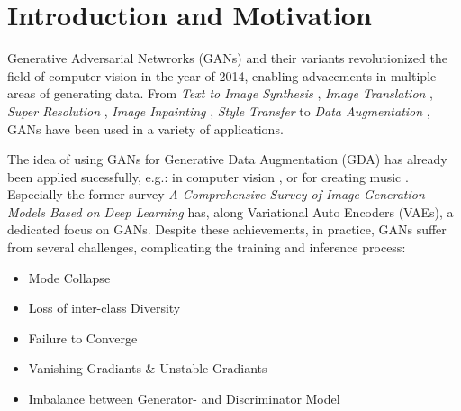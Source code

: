 \section{Introduction and Motivation}\label{introduction_and_motivation}
\pagestyle{fancy}
Generative Adversarial Netwrorks (GANs) \cite{goodfellow2014generativeadversarialnetworks} and their variants revolutionized the field of computer vision in the year of 2014, enabling advacements in multiple areas of generating data. From \textit{Text to Image Synthesis} \cite{reed2016generativeadversarialtextimage}, \textit{Image Translation} \cite{isola2018imagetoimagetranslationconditionaladversarial}, \textit{Super Resolution} \cite{ledig2017photorealisticsingleimagesuperresolution}, \textit{Image Inpainting} \cite{pathak2016contextencodersfeaturelearning}, \textit{Style Transfer} \cite{wang2023multimodalityguidedimagestyletransfer} to \textit{Data Augmentation} \cite{shorten2019survey}, GANs have been used in a variety of applications.

The idea of using GANs for Generative Data Augmentation (GDA) has already been applied sucessfully, e.g.: in computer vision \cite{Li2025comprehensivesurvedeepimages}, \cite{biswas2023generativeadversarialnetworksdata} or for creating music \cite{ji2020comprehensivesurveydeepmusic}. Especially the former survey \textit{A Comprehensive Survey of Image Generation Models Based on Deep Learning} has, along Variational Auto Encoders (VAEs), a dedicated focus on GANs. Despite these achievements, in practice, GANs suffer from several challenges, complicating the training and inference process:

\begin{itemize}\label{problems_of_gans}
    \setlength{\itemsep}{-5pt}
    \item Mode Collapse
    \item Loss of inter-class Diversity
    \item Failure to Converge
    \item Vanishing Gradiants \& Unstable Gradiants
    \item Imbalance between Generator- and Discriminator Model
\end{itemize}


